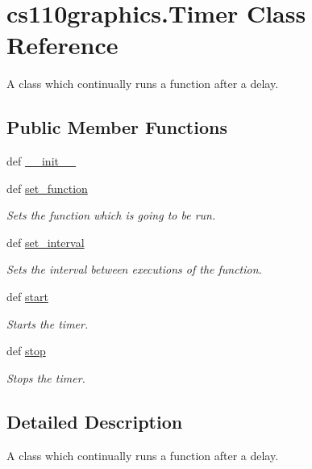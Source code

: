 \hypertarget{classcs110graphics_1_1Timer}{
\section{cs110graphics.Timer Class Reference}
\label{classcs110graphics_1_1Timer}
}


A class which continually runs a function after a delay.  
\subsection*{Public Member Functions}
\begin{DoxyCompactItemize}
\item 
def \hyperlink{classcs110graphics_1_1Timer_a7d40cc83eb4083d4afd97c3ce5279e1a}{\_\-\_\-init\_\-\_\-}
\item 
def \hyperlink{classcs110graphics_1_1Timer_aba0aae9c8bfff7c626112f0020383a8d}{set\_\-function}
\begin{DoxyCompactList}\small\item\em Sets the function which is going to be run. \item\end{DoxyCompactList}\item 
def \hyperlink{classcs110graphics_1_1Timer_ae176b030095b0d96fa0e91f2c398c40a}{set\_\-interval}
\begin{DoxyCompactList}\small\item\em Sets the interval between executions of the function. \item\end{DoxyCompactList}\item 
def \hyperlink{classcs110graphics_1_1Timer_afe14c3fd66571d0186a54a4075f31b7e}{start}
\begin{DoxyCompactList}\small\item\em Starts the timer. \item\end{DoxyCompactList}\item 
def \hyperlink{classcs110graphics_1_1Timer_a26ae5eb7c7da929f7e2b6e17e4b709b1}{stop}
\begin{DoxyCompactList}\small\item\em Stops the timer. \item\end{DoxyCompactList}\end{DoxyCompactItemize}


\subsection{Detailed Description}
A class which continually runs a function after a delay. 

